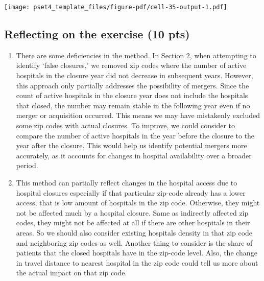 \documentclass[
  letterpaper,
  DIV=11,
  numbers=noendperiod]{scrartcl}
\begin{document}
\texttt{[image: pset4\_template\_files/figure-pdf/cell-35-output-1.pdf]}

\subsection{Reflecting on the exercise (10
pts)}\label{reflecting-on-the-exercise-10-pts}

\begin{enumerate}
\def\labelenumi{\arabic{enumi}.}
\item
  There are some deficiencies in the method. In Section 2, when
  attempting to identify `false closures,' we removed zip codes where
  the number of active hospitals in the closure year did not decrease in
  subsequent years. However, this approach only partially addresses the
  possibility of mergers. Since the count of active hospitals in the
  closure year does not include the hospitals that closed, the number
  may remain stable in the following year even if no merger or
  acquisition occurred. This means we may have mistakenly excluded some
  zip codes with actual closures. To improve, we could consider to
  compare the number of active hospitals in the year before the closure
  to the year after the closure. This would help us identify potential
  mergers more accurately, as it accounts for changes in hospital
  availability over a broader period.
\item
  This method can partially reflect changes in the hospital access due
  to hospital closures especially if that particular zip-code already
  has a lower access, that is low amount of hospitals in the zip code.
  Otherwise, they might not be affected much by a hospital closure. Same
  as indirectly affected zip codes, they might not be affected at all if
  there are other hospitals in their areas. So we should also consider
  existing hospitals density in that zip code and neighboring zip codes
  as well. Another thing to consider is the share of patients that the
  closed hospitals have in the zip-code level. Also, the change in
  travel distance to nearest hospital in the zip code could tell us more
  about the actual impact on that zip code.
\end{enumerate}
\end{document}
